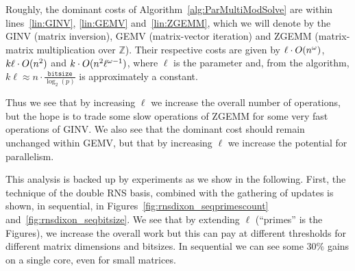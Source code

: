 Roughly, the dominant costs of Algorithm~\ref{alg:ParMultiModSolve}
are within lines~\ref{lin:GINV}, \ref{lin:GEMV} and~\ref{lin:ZGEMM},
which we will denote by the GINV (matrix inversion), GEMV
(matrix-vector iteration) and ZGEMM (matrix-matrix multiplication over
$\mathbb{Z}$).
Their respective costs are given by $\ell\cdot\GO{n^\omega}$,
$k\ell\cdot\GO{n^2}$ and $k\cdot\GO{n^2\ell^{\omega-1}}$,
where $\ell$ is the parameter and, from the algorithm, $k\ell\approx n \cdot
\frac{\texttt{bitsize}}{\log_2(p)}$ is approximately a constant.

Thus we see that by increasing $\ell$ we increase the overall number
of operations, but the hope is to trade some slow operations of ZGEMM
for some very fast operations of GINV.
We also see that the dominant cost should remain unchanged within GEMV, but
that by increasing $\ell$ we increase the potential for
parallelism.

This analysis is backed up by experiments as we show in the following.
%
First, the technique of the double RNS basis, combined with the
gathering of updates is shown, in sequential, in
Figures~\ref{fig:rnsdixon_seqprimescount}
and~\ref{fig:rnsdixon_seqbitsize}. We see that by extending $\ell$
(``primes'' is the Figures), we increase the overall work but this
can pay at different thresholds for different matrix dimensions and
bitsizes. In sequential we can see some $30\%$ gains on a single core,
even for small matrices.


